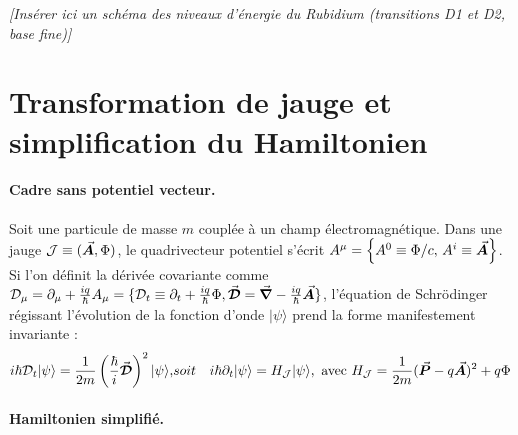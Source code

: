\vspace{1em}
\begin{center}
\textit{[Insérer ici un schéma des niveaux d’énergie du Rubidium (transitions D1 et D2, base fine)]}
\end{center}

\section{Transformation de jauge et simplification du Hamiltonien}


\paragraph{Cadre sans potentiel vecteur.}

Soit une particule de masse $m$ couplée à un champ électromagnétique. Dans une jauge $\mathcal{J} \equiv (\vec{{\bm{A}}}, \Phi)$, le quadrivecteur potentiel s’écrit $A^\mu = \left\{ A^0 \equiv \Phi/c,\, A^i \equiv \vec{{\bm{A}}} \right\}$. Si l’on définit la dérivée covariante comme $\mathcal{D}_\mu = \partial_\mu + \frac{iq}{\hbar} A_\mu = \{ \mathcal{D}_t \equiv \partial_t + \frac{iq}{\hbar} \Phi , \vec{{\bm{\mathcal{D}}}} = \vec{{\bm{\nabla}}} - \frac{iq}{\hbar} \vec{{\bm{A}}}  \} $, l’équation de Schrödinger régissant l’évolution de la fonction d’onde $\vert \psi \rangle$  prend la forme manifestement invariante :
\begin{eqnarray*}
	i\hbar \mathcal{D}_t \vert \psi \rangle = \frac{1}{2m} \left( \frac{\hbar}{i} \vec{{\bm{\mathcal{D}}}} \right)^2 \vert \psi \rangle, & soit &  i\hbar \partial_t \vert \psi \rangle = H_{\mathcal{J}} \vert \psi \rangle , ~\mbox{avec}~	H_{\mathcal{J}} = \frac{1}{2m} (\vec{{\bm{P}}} - q \vec{{\bm{A}}})^2 + q\Phi
\end{eqnarray*}


\paragraph{Hamiltonien simplifié.}

